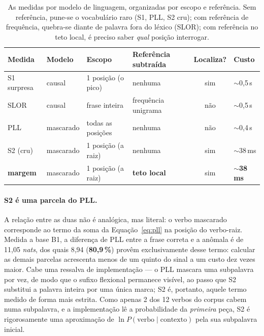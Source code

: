 \documentclass[11pt,a4paper]{article}
\newcommand{\dimtable}[1]{\small #1}
\begin{document}
\begin{table}[H]
\centering
\dimtable{
\begin{tabular}{@{}llllcl@{}}
\toprule
\textbf{Medida} & \textbf{Modelo} & \textbf{Escopo} & \textbf{Referência subtraída} & \textbf{Localiza?} & \textbf{Custo} \\
\midrule
S1 surpresa & causal     & 1 posição (o pico)   & nenhuma              & sim & $\sim$0,5\,s \\
SLOR        & causal     & frase inteira        & frequência unigrama  & não & $\sim$0,5\,s \\
PLL         & mascarado  & todas as posições    & nenhuma              & não & $\sim$0,4\,s \\
S2 (cru)    & mascarado  & 1 posição (a raiz)   & nenhuma              & sim & $\sim$38\,ms \\
\textbf{margem} & mascarado & 1 posição (a raiz) & \textbf{teto local}  & sim & \textbf{$\sim$38\,ms} \\
\bottomrule
\end{tabular}}
\caption{As medidas por modelo de linguagem, organizadas por escopo e referência. Sem referência,
pune-se o vocabulário raro (S1, PLL, S2 cru); com referência de frequência, quebra-se diante de
palavra fora do léxico (SLOR); com referência no teto local, é preciso saber \emph{qual} posição
interrogar.}
\label{tab:familia}
\end{table}

\paragraph{S2 é uma parcela do PLL.} A relação entre as duas não é analógica, mas literal: o verbo
mascarado corresponde ao termo da soma da Equação~\ref{eq:pll} na posição do verbo-raiz. Medida a
base B1, a diferença de PLL entre a frase correta e a anômala é de 11,05 \textit{nats}, dos quais
8,94 (\textbf{80,9\,\%}) provêm exclusivamente desse termo: calcular as demais parcelas acrescenta
menos de um quinto do sinal a um custo dez vezes maior. Cabe uma ressalva de implementação --- o PLL
mascara uma subpalavra por vez, de modo que o sufixo flexional permanece visível, ao passo que S2
substitui a palavra inteira por uma única marca; S2 é, portanto, aquele termo medido de forma mais
estrita. Como apenas 2 dos 12 verbos do corpus cabem numa subpalavra, e a implementação lê a
probabilidade da \emph{primeira} peça, S2 é rigorosamente uma aproximação de
$\ln P(\text{verbo} \mid \text{contexto})$ pela sua subpalavra inicial.
\end{document}
